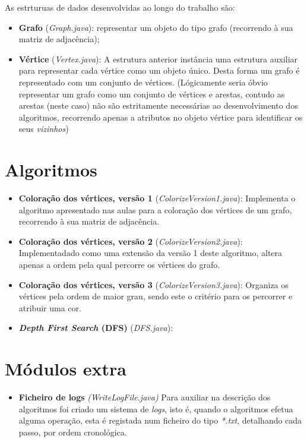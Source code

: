 \documentclass[a4paper,12pt]{report}
\begin{document}
As estrturuas de dados desenvolvidas ao longo do trabalho são:
\begin{itemize}
    \item \textbf{Grafo} (\textit{Graph.java}): representar um objeto do tipo grafo (recorrendo à sua matriz de adjacência);
    \item \textbf{Vértice} (\textit{Vertex.java}):
    A estrutura anterior instância uma estrutura auxiliar para representar cada vértice como um objeto único. Desta forma um grafo é representado com um conjunto de vértices.
    (Lógicamente seria óbvio representar um grafo como um conjunto de vértices e arestas, contudo as arestas (neste caso) não são estritamente necessárias ao desenvolvimento dos algoritmos, recorrendo apenas a atributos no objeto vértice para identificar os seus \textit{vizinhos})
\end{itemize}

\section{Algoritmos}

\begin{itemize}
    \item \textbf{Coloração dos vértices, versão 1} (\textit{ColorizeVersion1.java}):
    Implementa o algoritmo apresentado nas aulas para a coloração dos vértices de um grafo, recorrendo à sua matriz de adjacência.
    \item \textbf{Coloração dos vértices, versão 2} (\textit{ColorizeVersion2.java}):
    Implementadado como uma extensão da versão 1 deste algoritmo, altera apenas a ordem pela qual percorre os vértices do grafo.
    \item \textbf{Coloração dos vértices, versão 3} (\textit{ColorizeVersion3.java}): Organiza os vértices pela ordem de maior grau, sendo este o critério para os percorrer e atribuir uma cor.
    \item \textbf{\textit{Depth First Search} (DFS)} (\textit{DFS.java}):
\end{itemize}

\section{Módulos extra}

\begin{itemize}
    \item \textbf{Ficheiro de logs} \textit{(WriteLogFile.java)}
    Para auxiliar na descrição dos algoritmos foi criado um sistema de \textit{logs}, isto é, quando o algoritmos efetua alguma operação, esta é registada num ficheiro do tipo \textit{*.txt}, detalhando cada passo, por ordem cronológica.
    
\end{itemize}
\end{document}

